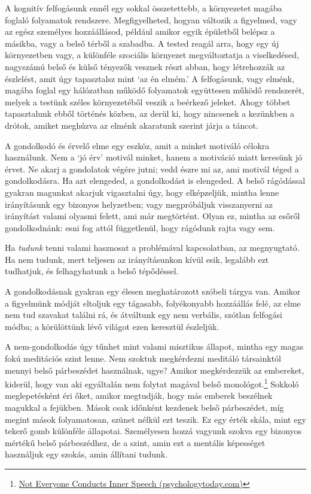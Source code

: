 A kognitív felfogásunk ennél egy sokkal összetettebb, a környezetet
magába foglaló folyamatok rendszere. Megfigyelheted, hogyan változik a
figyelmed, vagy az egész személyes hozzáállásod, például amikor egyik
épületből belépsz a másikba, vagy a belső térből a szabadba. A tested
reagál arra, hogy egy új környezetben vagy, a különféle szociális
környezet megváltoztatja a viselkedésed, nagyszámú belső és külső
tényezők vesznek részt abban, hogy létrehozzák az észlelést, amit úgy
tapasztalsz mint `az én elmém.' A felfogásunk, vagy elménk, magába
foglal egy hálózatban működő folyamatok együttesen működő rendszerét,
melyek a testünk széles környezetéből veszik a beérkező jeleket. Ahogy
többet tapasztalunk ebből történés közben, az derül ki, hogy nincsenek a
kezünkben a drótok, amiket meghúzva az elménk akaratunk szerint járja a
táncot.

A gondolkodó és érvelő elme egy eszköz, amit a minket motiváló célokra
használunk. Nem a `jó érv' motivál minket, hanem a motiváció miatt
keresünk jó érvet. Ne akarj a gondolatok végére jutni; vedd észre mi az,
ami motivál téged a gondolkodásra. Ha azt elengeded, a gondolkodást is
elengeded. A belső rágódással gyakran magunkat akarjuk vigasztalni úgy,
hogy elképzeljük, mintha lenne irányításunk egy bizonyos helyzetben;
vagy megpróbáljuk visszanyerni az irányítást valami olyasmi felett, ami
már megtörtént. Olyan ez, mintha az esőről gondolkodnánk: esni fog attól
függetlenül, hogy rágódunk rajta vagy sem.

Ha \emph{tudunk} tenni valami hasznosat a problémával kapcsolatban, az
megnyugtató. Ha nem tudunk, mert teljesen az irányításunkon kívül esik,
legalább ezt tudhatjuk, és felhagyhatunk a belső tépődéssel.

A gondolkodásnak gyakran egy élesen meghatározott szóbeli tárgya van.
Amikor a figyelmünk módját eltoljuk egy tágasabb, folyékonyabb
hozzáállás felé, az elme nem tud szavakat találni rá, és átváltunk egy
nem verbális, szótlan felfogási módba; a körülöttünk lévő világot ezen
keresztül észleljük.

A nem-gondolkodás úgy tűnhet mint valami misztikus állapot, mintha egy
magas fokú meditációs szint lenne. Nem szoktuk megkérdezni meditáló
társainktól mennyi belső párbeszédet használnak, ugye? Amikor
megkérdezzük az embereket, kiderül, hogy van aki egyáltalán nem folytat
magával belső monológot.\footnote{\href{https://www.psychologytoday.com/us/blog/pristine-inner-experience/201110/not-everyone-conducts-inner-speech}{Not
  Everyone Conducts Inner Speech (psychologytoday.com)}} Sokkoló
meglepetésként éri őket, amikor megtudják, hogy más emberek beszélnek
magukkal a fejükben. Mások csak időnként kezdenek belső párbeszédet, míg
megint mások folyamatosan, szünet nélkül ezt teszik. Ez egy érték skála,
mint egy tekerő gomb különféle állapotai. Személyesen hozzá vagyunk
szokva egy bizonyos mértékű belső párbeszédhez, de a szint, amin ezt a
mentális képességet használjuk egy szokás, amin állítani tudunk.

